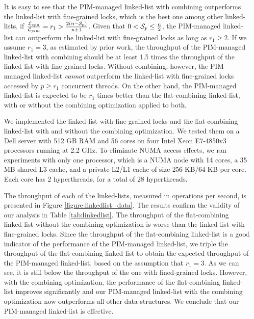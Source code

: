 It is easy to see that the PIM-managed linked-list with combining outperforms 
the linked-list with fine-grained locks, which is the best one among other linked-lists, 
if ${\mathcal{L}_{cpu} \over \mathcal{L}_{pim}} = r_1 > {2(n - \mathcal{S}_{p})\over n + 1}$.
Given that $0 < \mathcal{S}_{p} \le {n \over 2}$, 
the PIM-managed linked-list can outperform the linked-list with fine-grained locks as long as $r_1 \ge 2$. 
If we assume $r_1 = 3$, as estimated by prior work, the throughput of the PIM-managed linked-list with 
combining should be at least 1.5 times the throughput of the linked-list with fine-grained locks.
Without combining, however, the PIM-managed linked-list \emph{cannot}
outperform the linked-list with fine-grained locks accessed by $p \ge r_1$ concurrent threads.
On the other hand, the PIM-managed linked-list is expected to be $r_1$ times better than 
the flat-combining linked-list, with or without the combining optimization applied to both.  

We implemented the linked-list with fine-grained locks and the flat-combining linked-list 
with and without the combining optimization.
We tested them on a Dell server with 512 GB RAM and 
56 cores on four Intel Xeon E7-4850v3 processors running at 2.2 GHz.
To eliminate NUMA access effects, we ran experiments with only one processor, 
which is a NUMA node with 14 cores, a 35 MB shared L3 cache, 
and a private L2/L1 cache of size 256 KB/64 KB per core. 
Each core has 2 hyperthreads, for a total of 28 hyperthreads. 

The throughput of each of the linked-lists, measured in operations per second,
is presented in Figure \ref{figure:linkedlist_data}. 
The results confirm the validity of our analysis in Table \ref{tab:linkedlist}.
The throughput of the flat-combining linked-list without the combining optimization
is worse than the linked-list with fine-grained locks.
Since the throughput of the flat-combining linked-list is a good 
indicator of the performance of the PIM-managed linked-list, 
we triple the throughput of the flat-combining linked-list to obtain the expected throughput 
of the PIM-managed linked-list, based on the assumption that $r_1 = 3$. 
As we can see, it is still below the throughput of the one with fined-grained locks.
However, with the combining optimization, the performance of the flat-combining
linked-list improves significantly and our PIM-managed
linked-list with the combining optimization now outperforms all other data structures. 
We conclude that our PIM-managed linked-list is effective.

